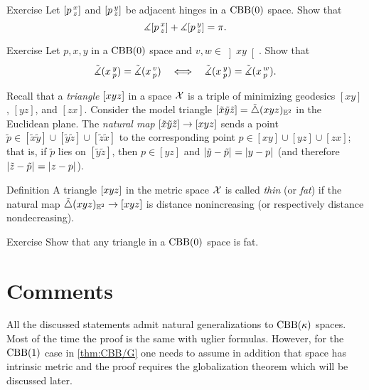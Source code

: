 \begin{thm}{Exercise}\label{ex:adjacent-CBB}
Let $[p\,{}^{x}_{z}]$ and $[p\,{}^{y}_{z}]$ be adjacent hinges in a $\mathrm{CBB}(0)$ space.
Show that
\[\measuredangle[p\,{}^{x}_{z}]+\measuredangle[p\,{}^{y}_{z}]= \pi.\]
\end{thm}


\begin{thm}{Exercise}
\label{ex:pxyvw}
Let 
$p,x,y$ in a $\mathrm{CBB}(0)$ space
and $v,w\in \left]xy\right[$.
Show that  
\[
\tilde\measuredangle(x\,{}^{y}_{p})=\tilde\measuredangle(x\,{}^{v}_{p})
\quad\Longleftrightarrow\quad
\tilde\measuredangle(x\,{}^{y}_{p})=\tilde\measuredangle(x\,{}^{w}_{p}).
\]

\end{thm}

Recall that a \emph{triangle} $[xyz]$ in a space $\mathcal{X}$ 
is a triple of minimizing geodesics $[xy]$, $[yz]$, and $[zx]$.
Consider the  model triangle $[\tilde x\tilde y\tilde z]=\tilde\triangle{}({x}{y}{z})_{\mathbb{E}^2}$ in the Euclidean plane.
The \emph{natural map} $[\tilde x\tilde y\tilde z]\to [xyz]$ 
sends a point $\tilde p\in[\tilde x\tilde y]\cup[\tilde y\tilde z]\cup[\tilde z\tilde x]$ to the corresponding point $p\in[ x y]\cup[y z]\cup[ z x]$;
that is, if $\tilde p$ lies on $[\tilde y\tilde z]$,
then $p\in [y z]$ and $\dist{\tilde y}{\tilde p}{}=\dist{y}{p}{}$ (and therefore $\dist{\tilde z}{\tilde p}{}=\dist{z}{p}{}$).
 
\begin{thm}{Definition}\label{def:k-thin-}
A triangle $[xyz]$ in the metric space $\mathcal{X}$ 
is called \emph{thin} (or \emph{fat}) if the natural map $\tilde\triangle{}({x}{y}{z})_{\mathbb{E}^2}\to [xyz]$ is distance nonincreasing (or respectively distance nondecreasing).

\end{thm}

\begin{thm}{Exercise}\label{ex:fat}
Show that any triangle in a $\mathrm{CBB}(0)$ space is fat.
\end{thm}

\section{Comments}

All the discussed statements admit natural generalizations to $\mathrm{CBB}(\kappa)$ spaces.
Most of the time the proof is the same with uglier formulas.
However, for the $\mathrm{CBB}(1)$ case in \ref{thm:CBB/G} one needs to assume in addition that space has intrinsic metric and the proof requires the globalization theorem which will be discussed later.


